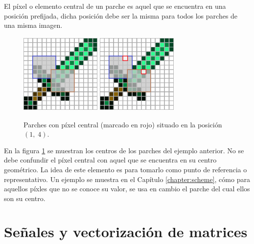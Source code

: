 \begin{definition}
	El p\'ixel o elemento central de un parche es aquel que se encuentra en una posici\'on prefijada, dicha posici\'on debe ser la misma para todos los parches de una misma imagen.
\end{definition}

\begin{figure}[h]
	\centering
	\includegraphics[width=4cm, height=4cm]{Graphics/diamon_sword_with_patches.png}
	\hspace{1cm}
	\includegraphics[width=4cm, height=4cm]{Graphics/diamon_sword_with_patches_and_centers.png}
	\caption{Parches con p\'ixel central (marcado en rojo) situado en la posici\'on $(1,\;4)$.}
	\label{ex:patch_center}
\end{figure}

En la figura \ref{ex:patch_center} se muestran los centros de los parches del ejemplo anterior. No se debe confundir el p\'ixel central con aquel que se encuentra en su centro geom\'etrico. La idea de este elemento es para tomarlo como punto de referencia o representativo. Un ejemplo se muestra en el Cap\'itulo \ref{chapter:scheme}, c\'omo para aquellos p\'ixles que no se conoce su valor, se usa en cambio el parche del cual ellos son su centro.

\section{Señales y vectorizaci\'on de matrices}\label{sec:signals}

